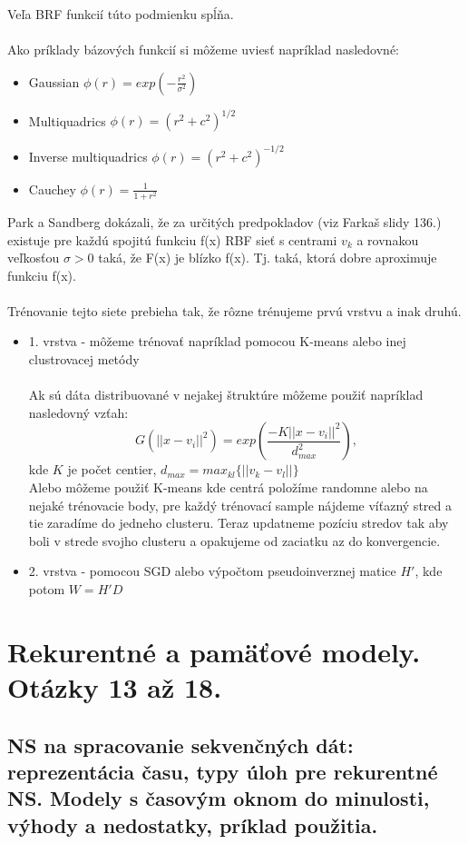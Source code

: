 \documentclass{article}
\numberwithin{equation}{section} %
\begin{document}
Veľa BRF funkcií túto podmienku spĺňa.
\\\\
Ako príklady bázových funkcií si môžeme uviesť napríklad nasledovné:\\
\begin{itemize}
\item Gaussian $\phi(r) = exp(-\frac{r^2}{\sigma^2})$
\item Multiquadrics $\phi(r) = (r^2 + c^2)^{1/2}$
\item Inverse multiquadrics $\phi(r) =  (r^2 + c^2)^{-1/2}$
\item Cauchey $\phi(r) = \frac{1}{1+r^2}$
\end{itemize}
Park a Sandberg dokázali, že za určitých predpokladov (viz Farkaš slidy 136.) existuje pre každú spojitú funkciu f(x) RBF sieť s centrami $v_k$ a rovnakou veľkosťou $\sigma > 0$ taká, že F(x) je blízko f(x). Tj. taká, ktorá dobre aproximuje funkciu f(x).
\\\\
Trénovanie tejto siete prebieha tak, že rôzne trénujeme prvú vrstvu a inak druhú.
\begin{itemize}
\item 1. vrstva - môžeme trénovať napríklad pomocou K-means alebo inej clustrovacej metódy \\\\
Ak sú dáta distribuované v nejakej štruktúre môžeme použiť napríklad nasledovný vzťah:
$$ G(||x-v_i||^2) = exp(\frac{-K||x-v_i||^2}{d^2_{max}}), $$ kde $K$ je počet centier, $d_{max} = max_{kl}\{||v_k - v_l||\}$\\ 
Alebo môžeme použiť K-means kde centrá položíme randomne alebo na nejaké trénovacie body, pre každý trénovací sample nájdeme víťazný stred a tie zaradíme do jedneho clusteru. Teraz updatneme pozíciu stredov tak aby boli v strede svojho clusteru a opakujeme od zaciatku az do konvergencie.
\item 2. vrstva - pomocou SGD alebo výpočtom pseudoinverznej matice $H'$, kde potom $W = H'D$
\end{itemize}



\section{Rekurentné a pamäťové modely. Otázky 13 až 18.}	
\subsection{NS na spracovanie sekvenčných dát: reprezentácia času, typy úloh pre rekurentné NS. Modely s časovým oknom do minulosti, výhody a nedostatky, príklad použitia.}
\end{document}
